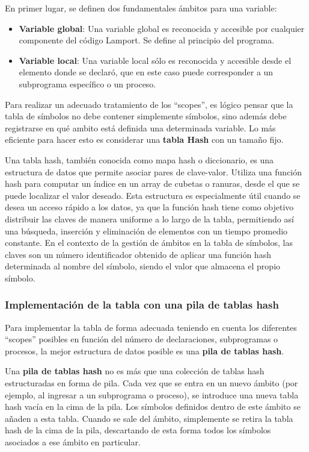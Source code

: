 \noindent
En primer lugar, se definen dos fundamentales ámbitos para una variable:
\begin{itemize}
    \item \textbf{Variable global}: Una variable global es reconocida y accesible por cualquier componente del código Lamport. Se define al principio del programa.
    \item \textbf{Variable local}: Una variable local sólo es reconocida y accesible desde el elemento donde se declaró, que en este caso puede corresponder a un subprograma específico o un proceso.
\end{itemize}

Para realizar un adecuado tratamiento de los ``scopes'', es lógico pensar que la tabla de símbolos no debe contener simplemente símbolos, sino además debe registrarse en qué ambito está definida una determinada variable. Lo más eficiente para hacer esto es considerar una \textbf{tabla Hash} con un tamaño fijo. 


Una tabla hash, también conocida como mapa hash o diccionario, es una estructura de datos que permite asociar pares de clave-valor. Utiliza una función hash para computar un índice en un array de cubetas o ranuras, desde el que se puede localizar el valor deseado. Esta estructura es especialmente útil cuando se desea un acceso rápido a los datos, ya que la función hash tiene como objetivo distribuir las claves de manera uniforme a lo largo de la tabla, permitiendo así una búsqueda, inserción y eliminación de elementos con un tiempo promedio constante. En el contexto de la gestión de ámbitos en la tabla de símbolos, las claves son un número identificador obtenido de aplicar una función hash determinada al nombre del símbolo, siendo el valor que almacena el propio símbolo.

\subsubsection{Implementación de la tabla con una pila de tablas hash}
Para implementar la tabla de forma adecuada teniendo en cuenta los diferentes ``scopes'' posibles en función del número de declaraciones, subprogramas o procesos, la mejor estructura de datos posible es una \textbf{pila de tablas hash}.

Una \textbf{pila de tablas hash} no es más que una colección de tablas hash estructuradas en forma de pila. Cada vez que se entra en un nuevo ámbito (por ejemplo, al ingresar a un subprograma o proceso), se introduce una nueva tabla hash vacía en la cima de la pila. Los símbolos definidos dentro de este ámbito se añaden a esta tabla. Cuando se sale del ámbito, simplemente se retira la tabla hash de la cima de la pila, descartando de esta forma todos los símbolos asociados a ese ámbito en particular.

